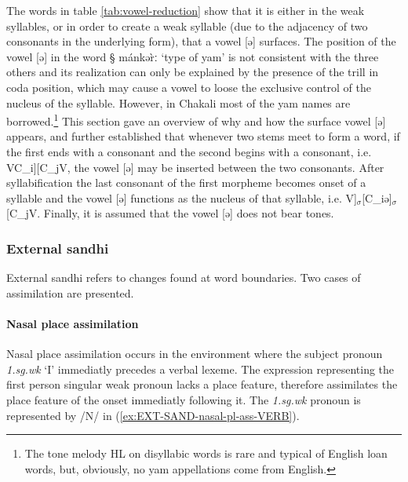 The words in table \ref{tab:vowel-reduction} show  that it is either in the weak
syllables, or in order to create
a weak syllable (due to the adjacency of two consonants in the underlying form),
 that a vowel [ə] surfaces. The position of the vowel [ə] in the word {\S
mánkər̀ː} `type of yam'  is not consistent with the three others and 
  its realization can only be explained by the presence of the trill in coda
position,
which may cause a vowel to loose the exclusive control of the nucleus of the
syllable. However, in Chakali most of the yam names are
borrowed.\footnote{The tone melody HL on disyllabic words is rare and
typical
of English loan words,  but, obviously, no yam appellations come from English.}
This section gave an overview of why and how the surface vowel [ə] appears, and
further established that whenever two stems meet to form a word, if the first 
ends with a consonant and the second begins with a consonant, i.e.
VC_{i}][C_{j}V, the vowel [ə] may be inserted between the two consonants. After
syllabification the last consonant of the first morpheme becomes onset of a
syllable and the vowel [ə] functions as the nucleus of that syllable, i.e.
V]$_{\sigma}$[C_{i}ə]$_{\sigma}$[C_{j}V.  Finally, it is  assumed that the vowel
[ə]
does not bear  tones. 





\subsubsection{External sandhi}
External sandhi refers to changes found at word boundaries.  Two cases
of  assimilation are presented.

\paragraph{Nasal place assimilation}
\label{sec:ext-nasal-place}

Nasal place assimilation occurs in the environment where the subject pronoun
 {\it 1.sg.wk} `I'  immediatly precedes a verbal lexeme. The
expression representing the first person singular weak pronoun lacks a place
feature, therefore assimilates the  place feature of the  
onset immediatly following it. The  {\it 1.sg.wk} pronoun is represented by  /N/
in
(\ref{ex:EXT-SAND-nasal-pl-ass-VERB}).

